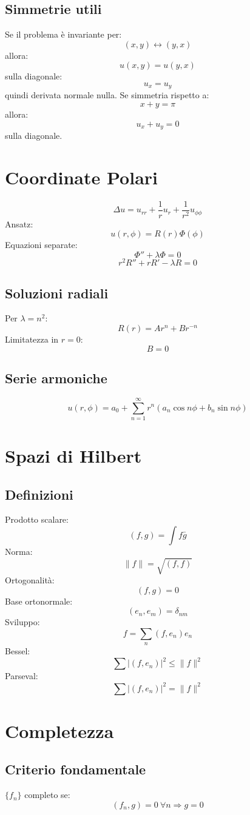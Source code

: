 \documentclass[a4paper,10pt]{article}
\begin{document}
\subsection{Simmetrie utili}
Se il problema è invariante per:
\[(x,y)\leftrightarrow(y,x)\]
allora:
\[u(x,y)=u(y,x)\]
sulla diagonale:
\[u_x=u_y\]
quindi derivata normale nulla.
Se simmetria rispetto a:
\[x+y=\pi\]
allora:
\[u_x+u_y=0\]
sulla diagonale.
\section{Coordinate Polari}
\[\Delta u=u_{rr}+\frac1r u_r+\frac1{r^2}u_{\phi\phi}\]
Ansatz:
\[u(r,\phi)=R(r)\Phi(\phi)\]
Equazioni separate:
\[\Phi''+\lambda\Phi=0\]
\[r^2R''+rR'-\lambda R=0\]
\subsection{Soluzioni radiali}
Per $\lambda=n^2$:
\[R(r)=Ar^n+Br^{-n}\]
Limitatezza in $r=0$:
\[B=0\]
\subsection{Serie armoniche}
\[u(r,\phi)=a_0+\sum_{n=1}^{\infty}r^n
(a_n\cos n\phi+b_n\sin n\phi)\]
\section{Spazi di Hilbert}
\subsection{Definizioni}
Prodotto scalare:
\[(f,g)=\int f\bar g\]
Norma:
\[\|f\|=\sqrt{(f,f)}\]
Ortogonalità:
\[(f,g)=0\]
Base ortonormale:
\[(e_n,e_m)=\delta_{nm}\]
Sviluppo:
\[f=\sum_n(f,e_n)e_n\]
Bessel:
\[\sum|(f,e_n)|^2\le \|f\|^2\]
Parseval:
\[\sum|(f,e_n)|^2=\|f\|^2\]
\section{Completezza}
\subsection{Criterio fondamentale}
$\{f_n\}$ completo se:
\[(f_n,g)=0\ \forall n
\Rightarrow g=0\]
\end{document}
